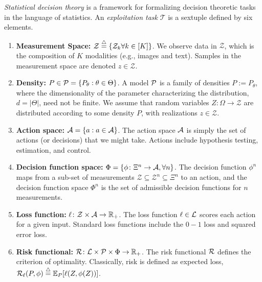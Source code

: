 \documentclass{article}
\begin{document}
\emph{Statistical decision theory} is a framework for formalizing decision theoretic tasks in the language of statistics.  An \emph{exploitation task} $\mathcal{T}$ is a sextuple defined by six elements.
\begin{enumerate}
  \item \textbf{Measurement Space:} $\mathcal{Z} \overset{\triangle}{=} \{ \mathcal{Z}_k \forall k \in [K]\}$. We observe data in $\mathcal{Z}$, which is the composition of  $K$ modalities (e.g., images and text).  Samples in the measurement space are denoted  $z \in \mathcal{Z}$.  
	\item \textbf{Density:} $P \in \mathcal{P}=\{P_{\theta}: \theta \in \Theta\}$.  A model $\mathcal{P}$ is a family of densities $P := P_{\theta}$, where the dimensionality of the parameter characterizing the distribution, $d=|\Theta|$, need not be finite.     We assume that random variables $Z \colon \Omega \to \mathcal{Z}$  are distributed according to some density $P$, with realizations $z \in \mathcal{Z}$.
	\item \textbf{Action space:} $\mathcal{A}=\{a : a \in \mathcal{A}\}$.  The action space $\mathcal{A}$ is simply the set of actions (or decisions) that we might take.  Actions  include hypothesis testing, estimation, and control. 
	\item \textbf{Decision function space:} $\Phi = \{\phi \colon \Xi^n \to \mathcal{A}, \forall n \}$. The decision function $\phi^n$ maps from a sub-set of measurements $\mathcal{Z} \subseteq \mathcal{Z}^n \subseteq \Xi^n$ to an action, and the decision function space $\Phi^n$ is the set of admissible decision functions for $n$ measurements.
	\item \textbf{Loss function:} $\ell \colon \mathcal{Z} \times \mathcal{A} \to \mathbb{R}_+$.  The loss function $\ell \in \mathcal{L}$ scores each action for a given input.  Standard loss functions include the $0-1$ loss and squared error loss. 
	\item \textbf{Risk functional:} $\mathcal{R} \colon \mathcal{L} \times \mathcal{P} \times \Phi \to \mathbb{R}_+$.	The risk functional $\mathcal{R}$ defines the criterion of optimality.  Classically, risk is defined as expected loss, $\mathcal{R}_\ell(P,\phi) \overset{\triangle}{=} \mathbb{E}_P[\ell(Z,\phi(Z))]$.
\end{enumerate}
\end{document}
